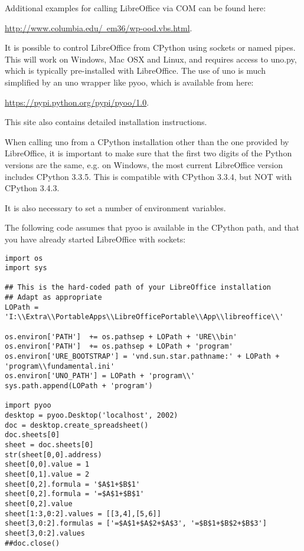 Additional examples for calling LibreOffice via COM can be found here:

\href{http://www.columbia.edu/~em36/wp-ood.vbs.html}{http://www.columbia.edu/~em36/wp-ood.vbs.html}. 


\vpara
It is possible to control LibreOffice from CPython using sockets or named pipes. This will work on Windows, Mac OSX and Linux, and requires access to uno.py, which is typically pre-installed with LibreOffice. The use of uno is much simplified by an uno wrapper like pyoo, which is available from here:

\vpara
\href{https://pypi.python.org/pypi/pyoo/1.0}{https://pypi.python.org/pypi/pyoo/1.0}. 

This site also contains detailed installation instructions. 

\vpara
When calling uno from a CPython installation other than the one provided by LibreOffice, it is important to make sure that the first two digits of the Python versions are the same, e.g. on Windows, the most current LibreOffice version includes CPython 3.3.5. This is compatible with CPython 3.3.4, but NOT with CPython 3.4.3.


\vpara
It is also necessary to set a number of environment variables. 

The following code assumes that pyoo is available in the CPython path, and that you have already started LibreOffice with sockets:


\begin{lstlisting}
import os
import sys

## This is the hard-coded path of your LibreOffice installation
## Adapt as appropriate
LOPath = 'I:\\Extra\\PortableApps\\LibreOfficePortable\\App\\libreoffice\\'

os.environ['PATH']  += os.pathsep + LOPath + 'URE\\bin'
os.environ['PATH']  += os.pathsep + LOPath + 'program'
os.environ['URE_BOOTSTRAP'] = 'vnd.sun.star.pathname:' + LOPath + 'program\\fundamental.ini'
os.environ['UNO_PATH'] = LOPath + 'program\\'
sys.path.append(LOPath + 'program')

import pyoo
desktop = pyoo.Desktop('localhost', 2002)
doc = desktop.create_spreadsheet()
doc.sheets[0]
sheet = doc.sheets[0]
str(sheet[0,0].address)
sheet[0,0].value = 1
sheet[0,1].value = 2
sheet[0,2].formula = '$A$1+$B$1'
sheet[0,2].formula = '=$A$1+$B$1'
sheet[0,2].value
sheet[1:3,0:2].values = [[3,4],[5,6]]
sheet[3,0:2].formulas = ['=$A$1+$A$2+$A$3', '=$B$1+$B$2+$B$3']
sheet[3,0:2].values
##doc.close()
\end{lstlisting}

